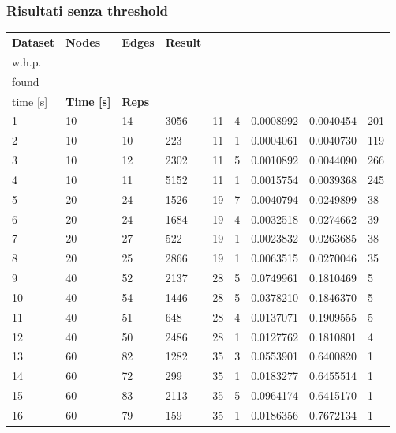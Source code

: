 \subsubsection{Risultati senza threshold}
\begin{longtable}{lllllllll}
  \textbf{Dataset} & \textbf{Nodes} & \textbf{Edges} & \textbf{Result} & \textbf{\begin{tabular}[c]{@{}l@{}}Rep\\ w.h.p.\end{tabular}} & \textbf{\begin{tabular}[c]{@{}l@{}}Mincut\\ found\end{tabular}} & \textbf{\begin{tabular}[c]{@{}l@{}}Discovery\\ time {[}s{]}\end{tabular}} & \textbf{Time {[}s{]}} & \textbf{Reps} \\
  \endhead
  1 & 10 & 14 & 3056 & 11 & 4 & 0.0008992 & 0.0040454 & 201 \\
  2 & 10 & 10 & 223 & 11 & 1 & 0.0004061 & 0.0040730 & 119 \\
  3 & 10 & 12 & 2302 & 11 & 5 & 0.0010892 & 0.0044090 & 266 \\
  4 & 10 & 11 & 5152 & 11 & 1 & 0.0015754 & 0.0039368 & 245 \\
  5 & 20 & 24 & 1526 & 19 & 7 & 0.0040794 & 0.0249899 & 38 \\
  6 & 20 & 24 & 1684 & 19 & 4 & 0.0032518 & 0.0274662 & 39 \\
  7 & 20 & 27 & 522 & 19 & 1 & 0.0023832 & 0.0263685 & 38 \\
  8 & 20 & 25 & 2866 & 19 & 1 & 0.0063515 & 0.0270046 & 35 \\
  9 & 40 & 52 & 2137 & 28 & 5 & 0.0749961 & 0.1810469 & 5 \\
  10 & 40 & 54 & 1446 & 28 & 5 & 0.0378210 & 0.1846370 & 5 \\
  11 & 40 & 51 & 648 & 28 & 4 & 0.0137071 & 0.1909555 & 5 \\
  12 & 40 & 50 & 2486 & 28 & 1 & 0.0127762 & 0.1810801 & 4 \\
  13 & 60 & 82 & 1282 & 35 & 3 & 0.0553901 & 0.6400820 & 1 \\
  14 & 60 & 72 & 299 & 35 & 1 & 0.0183277 & 0.6455514 & 1 \\
  15 & 60 & 83 & 2113 & 35 & 5 & 0.0964174 & 0.6415170 & 1 \\
  16 & 60 & 79 & 159 & 35 & 1 & 0.0186356 & 0.7672134 & 1 \\

\end{longtable}
